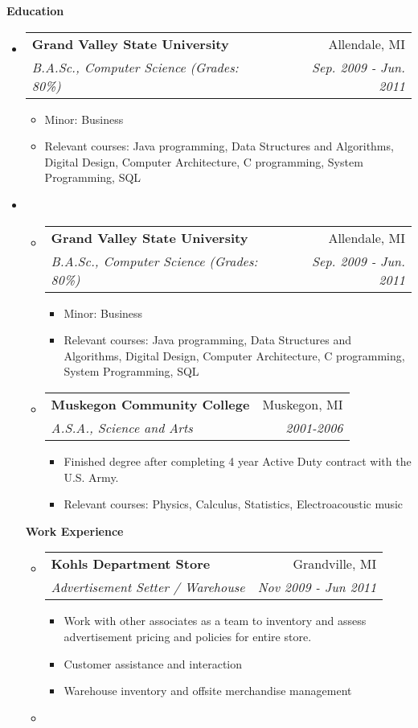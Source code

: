 \documentclass[letterpaper,11pt]{article}
\makeatletter
\newcommand{\resitem}[1]{\item #1 \vspace{-2pt}}
\newcommand{\resheading}[1]{{\large \colorbox{mygrey}{\begin{minipage}{\textwidth}{\textbf{#1 \vphantom{p\^{E}}}}\end{minipage}}}}
\newcommand{\ressubheading}[4]{
\begin{tabular*}{7.0in}{l@{\extracolsep{\fill}}r}
		\textbf{#1} & #2 \\
		\textit{#3} & \textit{#4} \\
\end{tabular*}\vspace{-6pt}}
\makeatother
\begin{document}
\resheading{Education}
\begin{itemize}
\item
	\ressubheading{Grand Valley State University}{Allendale, MI}{B.A.Sc., Computer Science (Grades: 80\%)}{Sep. 2009 - Jun. 2011}
	\begin{itemize}
		\resitem{Minor: Business}
		\resitem{Relevant courses: Java programming, Data Structures and Algorithms, Digital Design, Computer Architecture, C programming, System Programming, SQL}
	\end{itemize}

\item

\vspace{0.1in}

\begin{itemize}
\item
	\ressubheading{Grand Valley State University}{Allendale, MI}{B.A.Sc., Computer Science (Grades: 80\%)}{Sep. 2009 - Jun. 2011}
	\begin{itemize}
		\resitem{Minor: Business}
		\resitem{Relevant courses: Java programming, Data Structures and Algorithms, Digital Design, Computer Architecture, C programming, System Programming, SQL}
	\end{itemize}

\item

\vspace{0.1in}


	\ressubheading{Muskegon Community College}{Muskegon, MI}{A.S.A., Science and Arts }{2001-2006}
	\begin{itemize}
		\resitem{Finished degree after completing 4 year Active Duty contract with the U.S. Army.}
		\resitem{Relevant courses: Physics, Calculus, Statistics, Electroacoustic music}
	\end{itemize}

\end{itemize}

\resheading{Work Experience}
\begin{itemize}
\item 
	\ressubheading{Kohls Department Store}{Grandville, MI}{Advertisement Setter / Warehouse}{Nov 2009 - Jun 2011}
	\begin{itemize}
		\resitem{Work with other associates as a team to inventory and assess advertisement pricing and policies for entire store.}
		\resitem{Customer assistance and interaction}
		\resitem{Warehouse inventory and offsite merchandise management}
	\end{itemize}
\item


\end{itemize}
\end{itemize}
\end{document}

